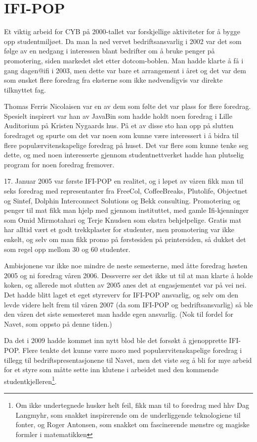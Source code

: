 \chapter{IFI-POP}

\author{Skrevet av Arne Hassel, godt hjulpet av Thomas Ferris Nicolaisen}

Et viktig arbeid for CYB på 2000-tallet var forskjellige aktiviteter for å bygge opp studentmiljøet. Da man la ned vervet bedriftsansvarlig i 2002 var det som følge av en nedgang i interessen blant bedrifter om å bruke penger på promotering, siden markedet slet etter dotcom-boblen. Man hadde klarte å få i gang dagen@ifi i 2003, men dette var bare et arrangement i året og det var dem som ønsket flere foredrag fra eksterne som ikke nødvendigvis var direkte tilknyttet fag.

Thomas Ferris Nicolaisen var en av dem som følte det var plass for flere foredrag. Spesielt inspirert var han av JavaBin som hadde holdt noen foredrag i Lille Auditorium på Kristen Nygaards hus. På et av disse sto han opp på slutten foredraget og spurte om det var noen som kunne være interessert i å bidra til flere populærvitenskapelige foredrag på huset. Det var flere som kunne tenke seg dette, og med noen interesserte gjennom studentnettverket hadde han plutselig program for noen foredrag fremover.

17. Januar 2005 var første IFI-POP en realitet, og i løpet av våren fikk man til seks foredrag med representanter fra FreeCol, CoffeeBreaks, Plutolife, Objectnet og Sintef, Dolphin Interconnect Solutions og Bekk consulting. Promotering og penger til mat fikk man hjelp med gjennom instituttet, med gamle Ifi-kjenninger som Omid Mirmotahari og Terje Knudsen som ekstra behjelpelige. Gratis mat har alltid vært et godt trekkplaster for studenter, men promotering var ikke enkelt, og selv om man fikk promo på førstesiden på printersiden, så dukket det som regel opp mellom 30 og 60 studenter.

Ambisjonene var ikke noe mindre de neste semesterne, med åtte foredrag høsten 2005 og ni foredrag våren 2006. Dessverre ser det ikke ut til at man klarte å holde koken, og allerede mot slutten av 2005 anes det at engasjementet var på vei nei. Det hadde blitt laget et eget styreverv for IFI-POP ansvarlig, og selv om den levde videre helt frem til våren 2007 (da som IFI-POP og bedriftsansvarlig) så ble den våren det siste semesteret man hadde egen ansvarlig. (Nok til fordel for Navet, som oppsto på denne tiden.)

Da det i 2009 hadde kommet inn nytt blod ble det forsøkt å gjenopprette IFI-POP. Flere tenkte det kunne være moro med populærvitenskapelige foredrag i tillegg til bedriftspresentasjonene til Navet, men det viste seg å bli for mye arbeid for et styre som måtte sette inn klutene i arbeidet med den kommende studentkjelleren\footnote{Om ikke undertegnede husker helt feil, fikk man til to foredrag med hhv Dag Langmyhr, som snakket inspirerende om de underliggende teknologiene til fonter, og Roger Antonsen, som snakket om fascinerende mønstre og magiske formler i matematikken}.


